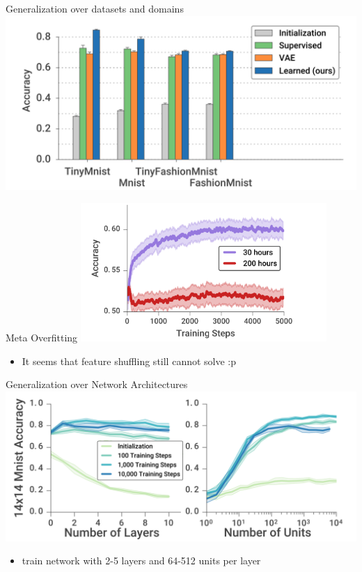 \documentclass{beamer}
\begin{document}
\begin{frame}{Generalization over datasets and domains}
  \center \includegraphics[width=\textwidth]{fig/mnist.png}
\end{frame}

\begin{frame}{Meta Overfitting}
  \center \includegraphics[width=0.7\textwidth]{fig/meta-overfitting.png}
  \begin{itemize}
    \item It seems that feature shuffling still cannot solve :p
  \end{itemize}
\end{frame}

\begin{frame}{Generalization over Network Architectures}
  \center \includegraphics[width=\textwidth]{fig/net-arch.png}
  \begin{itemize}
    \item train network with 2-5 layers and 64-512 units per layer
  \end{itemize}
\end{frame}
\end{document}
